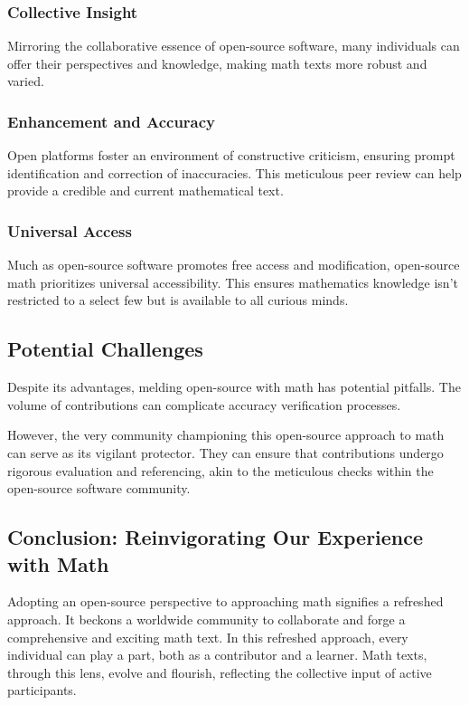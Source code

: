 \documentclass[a4paper,12pt]{book}
\begin{document}
\subsubsection*{Collective Insight}
Mirroring the collaborative essence of open-source software, many individuals can offer their perspectives and knowledge, making math texts more robust and varied.

\subsubsection*{Enhancement and Accuracy}
Open platforms foster an environment of constructive criticism, ensuring prompt identification and correction of inaccuracies. This meticulous peer review can help provide a credible and current mathematical text.

\subsubsection*{Universal Access}
Much as open-source software promotes free access and modification, open-source math prioritizes universal accessibility. This ensures mathematics knowledge isn't restricted to a select few but is available to all curious minds.

\subsection*{Potential Challenges}
Despite its advantages, melding open-source with math has potential pitfalls. The volume of contributions can complicate accuracy verification processes. 

However, the very community championing this open-source approach to math can serve as its vigilant protector. They can ensure that contributions undergo rigorous evaluation and referencing, akin to the meticulous checks within the open-source software community.

\subsection*{Conclusion: Reinvigorating Our Experience with Math}
Adopting an open-source perspective to approaching math signifies a refreshed approach. It beckons a worldwide community to collaborate and forge a comprehensive and exciting math text. In this refreshed approach, every individual can play a part, both as a contributor and a learner. Math texts, through this lens, evolve and flourish, reflecting the collective input of active participants.
\end{document}
